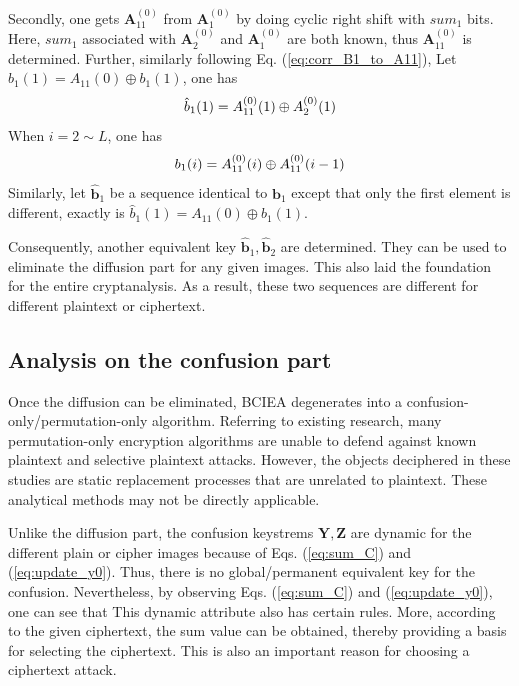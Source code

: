\documentclass[final,3p,times,twocolumn]{elsarticle}
\begin{document}
Secondly, one gets $\bm{A}_{11}^{(0)}$ from $\bm{A}_{1}^{(0)}$ by doing cyclic right shift with $sum_1$ bits. Here, $sum_1$ associated with $\bm{A}_{2}^{(0)}$ and $\bm{A}_{1}^{(0)}$ are both known, thus $\bm{A}_{11}^{(0)}$ is determined. Further, similarly following Eq. (\ref{eq:corr_B1_to_A11}), 
Let $\hat{b}_{1}(1)=A_{11}(0) \oplus b_{1}(1)$, one has
\begin{equation*}
\hat{b}_{1}(1)=A_{11}^{(0)}(1) \oplus A_{2}^{(0)}(1) \\
\end{equation*}
When $i=2 \sim L$, one has
\begin{equation*}
b_{1}(i) = A_{11}^{(0)}(i) \oplus  A_{11}^{(0)}(i-1) \\
\end{equation*}
Similarly, let $\bm{\hat{b}}_1$ be a sequence identical to $\bm{b}_1$ except that only the first element is different, exactly is $\hat{b}_{1}(1)=A_{11}(0) \oplus b_{1}(1)$.

Consequently, another equivalent key $\bm{\hat{b}}_1,\bm{\hat{b}}_2$ are determined. They can be used to eliminate the diffusion part for any given images. This also laid the foundation for the entire cryptanalysis. As a result, these two sequences are different for different plaintext or ciphertext.

\subsection{Analysis on the confusion part}
\label{ssec:break_confusion}

Once the diffusion can be eliminated, BCIEA degenerates into a confusion-only/permutation-only algorithm. Referring to existing research, many permutation-only encryption algorithms are unable to defend against known plaintext and selective plaintext attacks.
However, the objects deciphered in these studies are static replacement processes that are unrelated to plaintext. These analytical methods may not be directly applicable.

Unlike the diffusion part, the confusion keystrems $\bm{Y},\bm{Z}$ are dynamic for the different plain or cipher images because of Eqs. (\ref{eq:sum_C}) and (\ref{eq:update_y0}). Thus, there is no global/permanent equivalent key for the confusion.
Nevertheless, by observing Eqs. (\ref{eq:sum_C}) and (\ref{eq:update_y0}), one can see that This dynamic attribute also has certain rules. 
More, according to the given ciphertext, the sum value can be obtained, thereby providing a basis for selecting the ciphertext. This is also an important reason for choosing a ciphertext attack.
\end{document}

